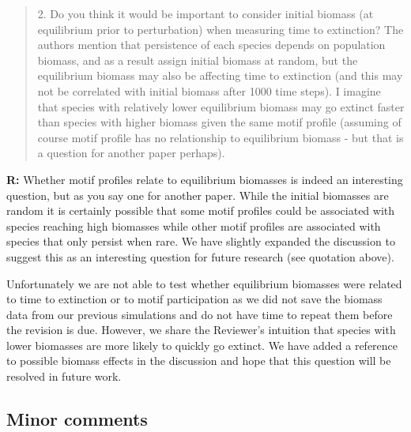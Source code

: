 \documentclass[12pt]{article}
\begin{document}

    \smallskip

    \begin{quotation}
      2. Do you think it would be important to consider initial biomass (at equilibrium prior to perturbation) when measuring time to extinction? The authors mention that persistence of each species depends on population biomass, and as a result assign initial biomass at random, but the equilibrium biomass may also be affecting time to extinction (and this may not be correlated with initial biomass after 1000 time steps). I imagine that species with relatively lower equilibrium biomass may go extinct faster than species with higher biomass given the same motif profile (assuming of course motif profile has no relationship to equilibrium biomass - but that is a question for another paper perhaps).   
    \end{quotation}

    \smallskip

    \textbf{R:} Whether motif profiles relate to equilibrium biomasses is indeed an interesting question, but as you say one for another paper. While the initial biomasses are random it is certainly possible that some motif profiles could be associated with species reaching high biomasses while other motif profiles are associated with species that only persist when rare. We have slightly expanded the discussion to suggest this as an interesting question for future research (see quotation above).


    Unfortunately we are not able to test whether equilibrium biomasses were related to time to extinction or to motif participation as we did not save the biomass data from our previous simulations and do not have time to repeat them before the revision is due. However, we share the Reviewer's intuition that species with lower biomasses are more likely to quickly go extinct. We have added a reference to possible biomass effects in the discussion and hope that this question will be resolved in future work.


    \smallskip


  \subsection*{Minor comments}
\end{document}
